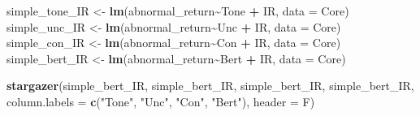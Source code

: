 \documentclass[
]{article}
\newenvironment{Shaded}{\begin{snugshade}}{\end{snugshade}}
\newcommand{\AttributeTok}[1]{\textcolor[rgb]{0.13,0.29,0.53}{#1}}
\newcommand{\FunctionTok}[1]{\textcolor[rgb]{0.13,0.29,0.53}{\textbf{#1}}}
\newcommand{\NormalTok}[1]{#1}
\newcommand{\OtherTok}[1]{\textcolor[rgb]{0.56,0.35,0.01}{#1}}
\newcommand{\SpecialCharTok}[1]{\textcolor[rgb]{0.81,0.36,0.00}{\textbf{#1}}}
\newcommand{\StringTok}[1]{\textcolor[rgb]{0.31,0.60,0.02}{#1}}
\begin{document}
\pagebreak

\begin{Shaded}
\begin{Highlighting}[]
\NormalTok{simple\_tone\_IR }\OtherTok{\textless{}{-}} \FunctionTok{lm}\NormalTok{(abnormal\_return}\SpecialCharTok{\textasciitilde{}}\NormalTok{Tone }\SpecialCharTok{+}\NormalTok{ IR, }\AttributeTok{data =}\NormalTok{ Core)}
\NormalTok{simple\_unc\_IR }\OtherTok{\textless{}{-}} \FunctionTok{lm}\NormalTok{(abnormal\_return}\SpecialCharTok{\textasciitilde{}}\NormalTok{Unc }\SpecialCharTok{+}\NormalTok{ IR, }\AttributeTok{data =}\NormalTok{ Core)}
\NormalTok{simple\_con\_IR }\OtherTok{\textless{}{-}} \FunctionTok{lm}\NormalTok{(abnormal\_return}\SpecialCharTok{\textasciitilde{}}\NormalTok{Con }\SpecialCharTok{+}\NormalTok{ IR, }\AttributeTok{data =}\NormalTok{ Core)}
\NormalTok{simple\_bert\_IR }\OtherTok{\textless{}{-}} \FunctionTok{lm}\NormalTok{(abnormal\_return}\SpecialCharTok{\textasciitilde{}}\NormalTok{Bert }\SpecialCharTok{+}\NormalTok{ IR, }\AttributeTok{data =}\NormalTok{ Core)}

\FunctionTok{stargazer}\NormalTok{(simple\_bert\_IR, simple\_bert\_IR, simple\_bert\_IR, simple\_bert\_IR,}
          \AttributeTok{column.labels =} \FunctionTok{c}\NormalTok{(}\StringTok{"Tone"}\NormalTok{, }\StringTok{"Unc"}\NormalTok{, }\StringTok{"Con"}\NormalTok{, }\StringTok{"Bert"}\NormalTok{), }\AttributeTok{header =}\NormalTok{ F)}
\end{Highlighting}
\end{Shaded}
\end{document}
